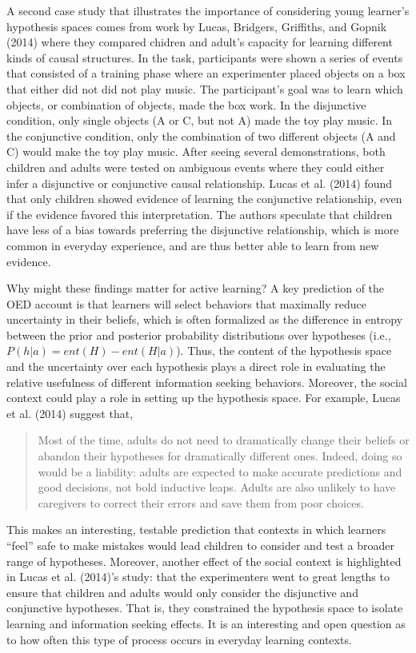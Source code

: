 \documentclass[english,floatsintext,man]{apa6}
\newcounter{author}
\theoremstyle{definition}
\theoremstyle{definition}
\theoremstyle{definition}
\theoremstyle{remark}
\begin{document}
A second case study that illustrates the importance of considering young
learner's hypothesis spaces comes from work by Lucas, Bridgers,
Griffiths, and Gopnik (2014) where they compared chidren and adult's
capacity for learning different kinds of causal structures. In the task,
participants were shown a series of events that consisted of a training
phase where an experimenter placed objects on a box that either did not
did not play music. The participant's goal was to learn which objects,
or combination of objects, made the box work. In the disjunctive
condition, only single objects (A or C, but not A) made the toy play
music. In the conjunctive condition, only the combination of two
different objects (A and C) would make the toy play music. After seeing
several demonstrations, both children and adults were tested on
ambiguous events where they could either infer a disjunctive or
conjunctive causal relationship. Lucas et al. (2014) found that only
children showed evidence of learning the conjunctive relationship, even
if the evidence favored this interpretation. The authors speculate that
children have less of a bias towards preferring the disjunctive
relationship, which is more common in everyday experience, and are thus
better able to learn from new evidence.

Why might these findings matter for active learning? A key prediction of
the OED account is that learners will select behaviors that maximally
reduce uncertainty in their beliefs, which is often formalized as the
difference in entropy between the prior and posterior probability
distributions over hypotheses (i.e., \(P(h|a) = ent(H) - ent(H|a)\)).
Thus, the content of the hypothesis space and the uncertainty over each
hypothesis plays a direct role in evaluating the relative usefulness of
different information seeking behaviors. Moreover, the social context
could play a role in setting up the hypothesis space. For example, Lucas
et al. (2014) suggest that,

\begin{quote}
Most of the time, adults do not need to dramatically change their
beliefs or abandon their hypotheses for dramatically different ones.
Indeed, doing so would be a liability: adults are expected to make
accurate predictions and good decisions, not bold inductive leaps.
Adults are also unlikely to have caregivers to correct their errors and
save them from poor choices.
\end{quote}

\noindent
This makes an interesting, testable prediction that contexts in which
learners \enquote{feel} safe to make mistakes would lead children to
consider and test a broader range of hypotheses. Moreover, another
effect of the social context is highlighted in Lucas et al. (2014)'s
study: that the experimenters went to great lengths to ensure that
children and adults would only consider the disjunctive and conjunctive
hypotheses. That is, they constrained the hypothesis space to isolate
learning and information seeking effects. It is an interesting and open
question as to how often this type of process occurs in everyday
learning contexts.
\end{document}
